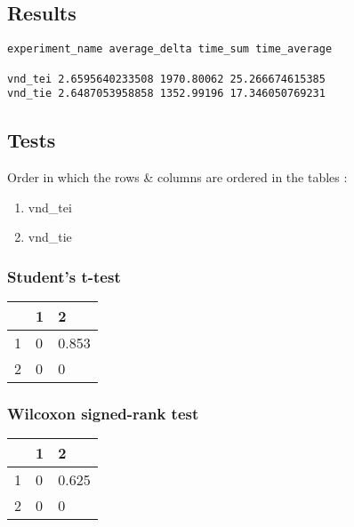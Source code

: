\subsection{Results}

\begin{lstlisting}
experiment_name average_delta time_sum time_average

vnd_tei 2.6595640233508 1970.80062 25.266674615385
vnd_tie 2.6487053958858 1352.99196 17.346050769231
\end{lstlisting}

\newpage

\subsection{Tests}

\noindent Order in which the rows \& columns are ordered in the tables :

\begin{enumerate}
    \itemsep-0.5em
    \item vnd\_tei
    \item vnd\_tie
\end{enumerate}

\subsubsection{Student's t-test}

\begin{table}[h]
\begin{tabular}{|l||l|l|}
\hline
 & 1 & 2 \\ \hline
\hline
1 & 0 & 0.853 \\ \hline
2 & 0 & 0 \\ \hline
\end{tabular}
\end{table}

\subsubsection{Wilcoxon signed-rank test}

\begin{table}[h]
\begin{tabular}{|l||l|l|}
\hline
 & 1 & 2 \\ \hline
\hline
1 & 0 & 0.625 \\ \hline
2 & 0 & 0 \\ \hline
\end{tabular}
\end{table}

\newpage
